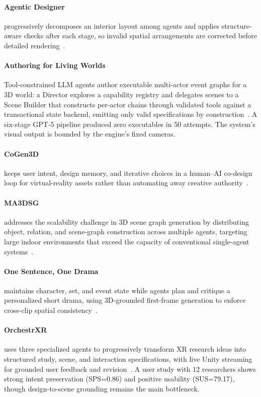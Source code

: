 \paragraph{Agentic Designer} progressively decomposes an interior layout among agents and applies structure-aware checks after each stage, so invalid spatial arrangements are corrected before detailed rendering~\cite{avg260720866}.

\paragraph{Authoring for Living Worlds}
Tool-constrained LLM agents author executable multi-actor event graphs for a 3D world: a Director explores a capability registry and delegates scenes to a Scene Builder that constructs per-actor chains through validated tools against a transactional state backend, emitting only valid specifications by construction~\cite{avg260410383}. A six-stage GPT-5 pipeline produced zero executables in 50 attempts. The system's visual output is bounded by the engine's fixed cameras.

\paragraph{CoGen3D} keeps user intent, design memory, and iterative choices in a human--AI co-design loop for virtual-reality assets rather than automating away creative authority~\cite{avg260703731}.

\paragraph{MA3DSG} addresses the scalability challenge in 3D scene graph generation by distributing object, relation, and scene-graph construction across multiple agents, targeting large indoor environments that exceed the capacity of conventional single-agent systems~\cite{avg260204152}.

\paragraph{One Sentence, One Drama} maintains character, set, and event state while agents plan and critique a personalized short drama, using 3D-grounded first-frame generation to enforce cross-clip spatial consistency~\cite{avg260522144}.

\paragraph{OrchestrXR}
 uses three specialized agents to progressively transform XR research ideas into structured study, scene, and interaction specifications, with live Unity streaming for grounded user feedback and revision~\cite{avg260701588}. A user study with 12 researchers shows strong intent preservation (SPS=0.86) and positive usability (SUS=79.17), though design-to-scene grounding remains the main bottleneck. 


